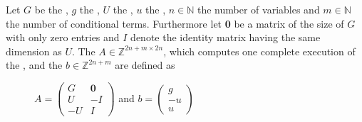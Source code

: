 \begin{definition}
	\label{def:iteration}
	Let $G$ be the \guardmatrix, $g$ the \guardconstants, $U$ the \updatematrix, $u$ the \updateconstants, $n\in \mathbb{N}$ the number of variables and $m \in \mathbb{N}$ the number of conditional terms. \newline
	Furthermore let \textbf{0} be a matrix of the size of $G$ with only zero entries and $I$ denote the identity matrix having the same dimension as $U$. \newline
	The \iterationmatrix $A \in \mathbb{Z}^{2n+m \times 2n}$, which computes one complete execution of the \loopt, and the \iterationconstants $b\in \mathbb{Z}^{2n+m} $ are defined as
	\begin{figure}[H]
		\centering
		$A = \begin{pmatrix} G & \textbf{0} \\ U & -I \\ -U & I \end{pmatrix}$ and $b = \begin{pmatrix} g \\ -u \\ u \end{pmatrix}$ \cite{leike2014geometric}
	\end{figure}	
\end{definition}

